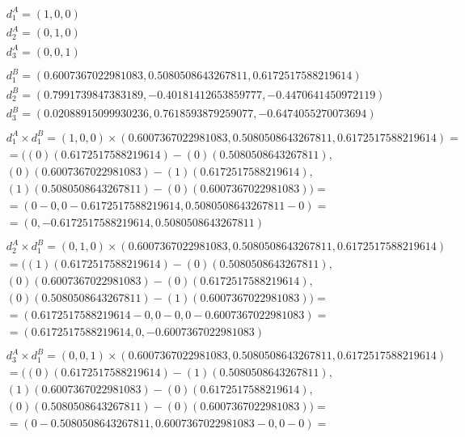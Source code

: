 \documentclass[a4paper]{article}
\begin{document}
	\begin{align*}
		&d_1^A = (1, 0, 0) 
		\\
		&d_2^A = (0, 1, 0) 
		\\
		&d_3^A = (0, 0, 1)
		\\
		\\
		&d_1^B = (0.6007367022981083, 0.5080508643267811, 0.6172517588219614)
		\\
		&d_2^B = (0.7991739847383189, -0.40181412653859777, -0.4470641450972119)
		\\
		&d_3^B = (0.02088915099930236, 0.7618593879259077, -0.6474055270073694)
		\\
		\\
		&d_1^A \times d_1^B = (1, 0, 0) \times (0.6007367022981083, 0.5080508643267811, 0.6172517588219614) =
		\\
		&= ((0) (0.6172517588219614) - (0) (0.5080508643267811), 
		\\
		&(0) (0.6007367022981083) - (1) (0.6172517588219614), 
		\\
		&(1) (0.5080508643267811) - (0) (0.6007367022981083)) =
		\\
		&=(0-0, 0-0.6172517588219614, 0.5080508643267811-0)=
		\\
		&=(0, -0.6172517588219614, 0.5080508643267811)
		\\
		\\
		&d_2^A \times d_1^B = (0, 1, 0) \times (0.6007367022981083, 0.5080508643267811, 0.6172517588219614)
		\\
		&= ((1) (0.6172517588219614) - (0) (0.5080508643267811), 
		\\
		&(0) (0.6007367022981083) - (0) (0.6172517588219614), 
		\\
		&(0) (0.5080508643267811) - (1) (0.6007367022981083)) =
		\\
		&=(0.6172517588219614-0, 0-0, 0-0.6007367022981083)=
		\\
		&=(0.6172517588219614, 0, -0.6007367022981083)
		\\
		\\
		&d_3^A \times d_1^B = (0, 0, 1) \times (0.6007367022981083, 0.5080508643267811, 0.6172517588219614)
		\\
		&= ((0) (0.6172517588219614) - (1) (0.5080508643267811), 
		\\
		&(1) (0.6007367022981083) - (0) (0.6172517588219614), 
		\\
		&(0) (0.5080508643267811) - (0) (0.6007367022981083)) =
		\\
		&=(0-0.5080508643267811, 0.6007367022981083-0, 0-0)=

\end{align*}
\end{document}
